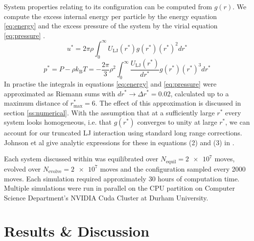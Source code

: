 \documentclass[10pt, twocolumn]{revtex4}    %
\begin{document}
System properties relating to its configuration can be computed from $g(r)$. We compute the excess internal energy per particle by the energy equation \ref{eq:energy} and the excess pressure of the system by the virial equation \ref{eq:pressure} \cite{WoodParker, Johnson}.
\begin{equation}
u^{*} = 2\pi{}\rho{}\int_{0}^{\infty}U_\text{LJ}(r^{*})g(r^{*})(r^{*})^{2}dr^{*}
\label{eq:energy}
\end{equation}
\begin{equation}
p^{*} = P - \rho{}k_\text{B}T = - \frac{2\pi}{3}\rho{}^{2} \int_{0}^{\infty}\frac{U_\text{LJ}(r^{*})}{dr^{*}}g(r^{*})(r^{*})^{3}dr^{*}
\label{eq:pressure}
\end{equation}
In practise the integrals in equations \ref{eq:energy} and \ref{eq:pressure} were approximated as Riemann sums with $dr^{*} \rightarrow{} \Delta{}r^{*} = 0.02$, calculated up to a maximum distance of $r_\text{max}^{*}=6$. The effect of this approximation is discussed in section \ref{ss:numerical}.
With the assumption that at a sufficiently large $r^{*}$ every system looks homogeneous, i.e. that $g(r^{*})$ converges to unity at large $r^{*}$, we can account for our truncated LJ interaction using standard long range corrections. Johnson et al give analytic expressions for these in equations (2) and (3) in \cite{Johnson}.

Each system discussed within was equilibrated over $N_\text{equil}=\num{2e7}$ moves, evolved over $N_\text{evolve}=\num{2e7}$ moves and the configuration sampled every \num{2000} moves. Each simulation required approximately 30 hours of computation time. Multiple simulations were run in parallel on the CPU partition on Computer Science Department's NVIDIA Cuda Cluster at Durham University.



\section{Results \& Discussion} \label{s:results}
\end{document}
